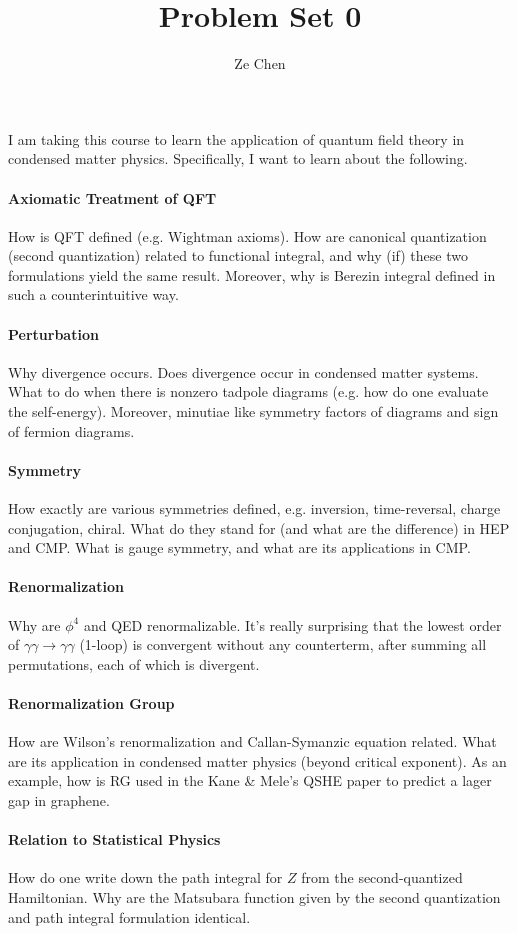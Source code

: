 \documentclass{article}
\title{Problem Set 0}
\author{Ze Chen}
\begin{document}
\maketitle

I am taking this course to learn the application of quantum field theory in condensed matter physics. Specifically, I want to learn about the following.

\paragraph*{Axiomatic Treatment of QFT}
How is QFT defined (e.g. Wightman axioms).
How are canonical quantization (second quantization) related to functional integral, and why (if) these two formulations yield the same result.
Moreover, why is Berezin integral defined in such a counterintuitive way.

\paragraph*{Perturbation}
Why divergence occurs.
Does divergence occur in condensed matter systems.
What to do when there is nonzero tadpole diagrams (e.g. how do one evaluate the self-energy).
Moreover, minutiae like symmetry factors of diagrams and sign of fermion diagrams.

\paragraph*{Symmetry}
How exactly are various symmetries defined, e.g. inversion, time-reversal, charge conjugation, chiral.
What do they stand for (and what are the difference) in HEP and CMP.
What is gauge symmetry, and what are its applications in CMP.

\paragraph*{Renormalization}
Why are $\phi^4$ and QED renormalizable.
It's really surprising that the lowest order of $\gamma\gamma\rightarrow\gamma\gamma$ (1-loop) is convergent without any counterterm, after summing all permutations, each of which is divergent.

\paragraph*{Renormalization Group}
How are Wilson's renormalization and Callan-Symanzic equation related.
What are its application in condensed matter physics (beyond critical exponent).
As an example, how is RG used in the Kane \& Mele's QSHE paper to predict a lager gap in graphene.

\paragraph*{Relation to Statistical Physics}
How do one write down the path integral for $Z$ from the second-quantized Hamiltonian.
Why are the Matsubara function given by the second quantization and path integral formulation identical.

% 
% 
\end{document}
